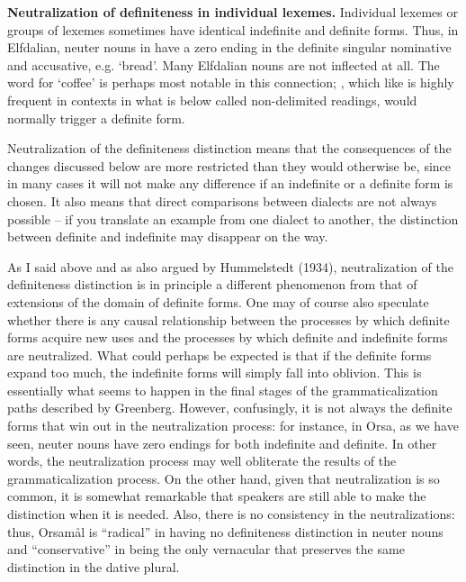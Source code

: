 \textbf{Neutralization of definiteness in individual lexemes. }Individual lexemes or groups of lexemes sometimes have identical indefinite and definite forms. Thus, in Elfdalian, neuter nouns in have a zero ending in the definite singular nominative and accusative, e.g.  ‘bread’. Many Elfdalian nouns are not inflected at all.  The word for ‘coffee’ is perhaps most notable in this connection; , which like  is highly frequent in contexts in what is below called non-delimited readings, would normally trigger a definite form. 

Neutralization of the definiteness distinction means that the consequences of the changes discussed below are more restricted than they would otherwise be, since in many cases it will not make any difference if an indefinite or a definite form is chosen. It also means that direct comparisons between dialects are not always possible – if you translate an example from one dialect to another, the distinction between definite and indefinite may disappear on the way. 

As I said above and as also argued by Hummelstedt (1934), neutralization of the definiteness distinction is in principle a different phenomenon from that of extensions of the domain of definite forms. One may of course also speculate whether there is any causal relationship between the processes by which definite forms acquire new uses and the processes by which definite and indefinite forms are neutralized. What could perhaps be expected is that if the definite forms expand too much, the indefinite forms will simply fall into oblivion. This is essentially what seems to happen in the final stages of the grammaticalization paths described by Greenberg. However, confusingly, it is not always the definite forms that win out in the neutralization process: for instance, in Orsa, as we have seen, neuter nouns have zero endings for both indefinite and definite. In other words, the neutralization process may well obliterate the results of the grammaticalization process. On the other hand, given that neutralization is so common, it is somewhat remarkable that speakers are still able to make the distinction when it is needed. Also, there is no consistency in the neutralizations: thus, Orsamål is “radical” in having no definiteness distinction in neuter nouns and “conservative” in being the only vernacular that preserves the same distinction in the dative plural.

